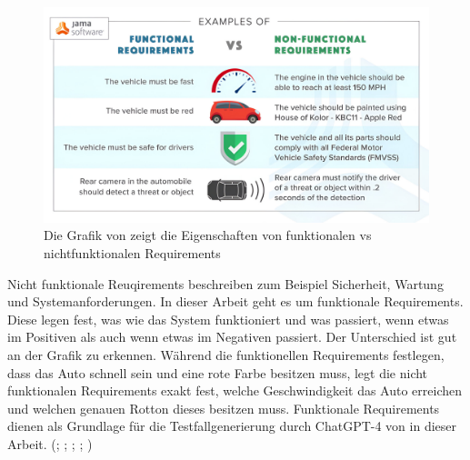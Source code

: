 \documentclass[12pt,toc=bib,toc=listof]{scrreprt}
\begin{document}
\begin{figure}[H]
    \centering
    \includegraphics[width=0.75\linewidth]{./Bilder/Jama Software_Eigenschaften von funktionalen vs nichtfunktionalen Requirements.jpeg}
    \caption{Die Grafik von \textcite{JamaSoftware2024} zeigt die Eigenschaften von funktionalen vs nichtfunktionalen Requirements}
    \label{fig:enter-label}
\end{figure}
\noindent Nicht funktionale Reuqirements beschreiben zum Beispiel Sicherheit, Wartung und Systemanforderungen. In dieser Arbeit geht es um funktionale Requirements. Diese legen fest, was wie das System funktioniert und was passiert, wenn etwas im Positiven als auch wenn etwas im Negativen passiert. Der Unterschied ist gut an der Grafik zu erkennen. Während die funktionellen Requirements festlegen, dass das Auto schnell sein und eine rote Farbe besitzen muss, legt die nicht funktionalen Requirements exakt fest, welche Geschwindigkeit das Auto erreichen und welchen genauen Rotton dieses besitzen muss. Funktionale Requirements dienen als Grundlage für die Testfallgenerierung durch ChatGPT-4 von \textcite{OpenAI2025} in dieser Arbeit. (\cite{Aysolmaz2018}; \cite{Barmi2011}; \cite{JamaSoftware2024}; \cite{Mustafa2021}; \cite{Visure2024})
\end{document}
